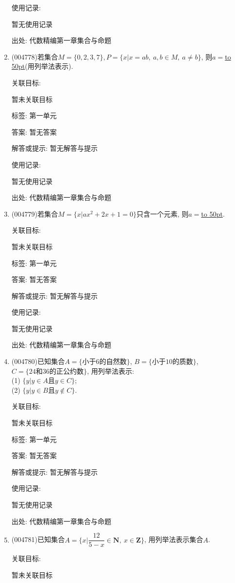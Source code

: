 \documentclass[10pt,a4paper]{article}
\newcommand{\blank}[1]{\underline{\hbox to #1pt{}}}
\begin{document}
\begin{enumerate}[1.]
使用记录:

暂无使用记录


出处: 代数精编第一章集合与命题
\item { (004778)}若集合$M=\{0,2,3,7\},P=\{x|x=ab, \ a,b\in M, \ a\ne b\}$, 则$a=$\blank{50}(用列举法表示).


关联目标:

暂未关联目标



标签: 第一单元

答案: 暂无答案

解答或提示: 暂无解答与提示

使用记录:

暂无使用记录


出处: 代数精编第一章集合与命题
\item { (004779)}若集合$M=\{x|ax^2+2x+1=0\}$只含一个元素, 则$a=$\blank{50}.


关联目标:

暂未关联目标



标签: 第一单元

答案: 暂无答案

解答或提示: 暂无解答与提示

使用记录:

暂无使用记录


出处: 代数精编第一章集合与命题
\item { (004780)}已知集合$A=\{\text{小于}6\text{的自然数}\}$, $B=\{\text{小于}10\text{的质数}\}$, $C=\{24\text{和}36\text{的正公约数}\}$, 用列举法表示:\\
(1) $\{y|y\in A\text{且}y\in C\}$;\\
(2) $\{y|y\in B\text{且}y\notin C\}$.


关联目标:

暂未关联目标



标签: 第一单元

答案: 暂无答案

解答或提示: 暂无解答与提示

使用记录:

暂无使用记录


出处: 代数精编第一章集合与命题
\item { (004781)}已知集合$A=\{x|\dfrac{12}{5-x}\in \mathbf{N},\ x\in\mathbf{Z}\}$, 用列举法表示集合$A$.


关联目标:

暂未关联目标




\end{enumerate}
\end{document}
